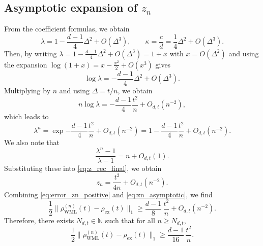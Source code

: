 \documentclass[superscriptaddress,amsmath,amssymb,aps,pra,letterpaper,tightenlines,notitlepages,12pt]{revtex4-2}
\begin{document}
\subsection{Asymptotic expansion of $z_n$}
From the coefficient formulas, we obtain
\begin{equation}
\lambda = 1-\frac{d-1}{4}\Delta^2+O(\Delta^3),
\qquad
\kappa=\frac{c}{d}=\frac14\Delta^2+O(\Delta^3).
\end{equation}
Then, by writing $\lambda=1-\frac{d-1}{4}\Delta^2+O(\Delta^3)=1+x$ with $x=O(\Delta^2)$ and using the expansion $\log(1+x)=x-\frac{x^2}{2}+O(x^3)$ gives
\begin{equation}
\log\lambda=-\frac{d-1}{4}\Delta^2+O(\Delta^3).
\end{equation}
Multiplying by $n$ and using $\Delta=t/n$, we obtain
\begin{equation}
n\log\lambda = -\frac{d-1}{4}\frac{t^2}{n}+O_{d,t}(n^{-2}),
\end{equation}
which leads to
\begin{equation}
\lambda^n = \exp{-\frac{d-1}{4}\frac{t^2}{n} + O_{d,t}(n^{-2})}=1-\frac{d-1}{4}\frac{t^2}{n} + O_{d,t}(n^{-2}).
\end{equation}
We also note that 
\begin{equation}
\frac{\lambda^n-1}{\lambda-1} = n + O_{d,t}(1).
\end{equation}
Substituting these into \eqref{eq:z_rec_final}, we obtain
\begin{equation}
z_n = \frac{t^2}{4n} + O_{d,t}(n^{-2}).
\label{eq:zn_asymptotic}
\end{equation}
Combining \eqref{eq:error_zn_positive} and \eqref{eq:zn_asymptotic}, we find
\begin{equation}
\frac{1}{2}\|\rho_{\mathrm{WML}}^{(n)}(t)-\rho_{\mathrm{ex}}(t)\|_1
\ge \frac{d-1}{8}\,\frac{t^2}{n} + O_{d,t}(n^{-2}).
\end{equation}
Therefore, there exists $N_{d,t}\in\mathbb N$ such that for all $n\ge N_{d,t}$,
\begin{equation}
\frac{1}{2}\|\rho_{\mathrm{WML}}^{(n)}(t)-\rho_{\mathrm{ex}}(t)\|_1
\ge \frac{d-1}{16}\,\frac{t^2}{n}.
\label{eq:error_lower_rzero}
\end{equation}
\end{document}
